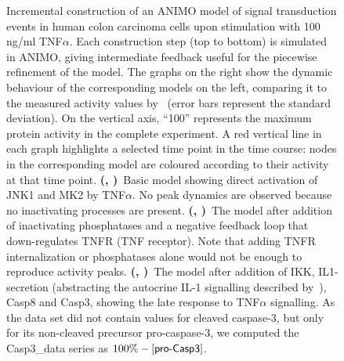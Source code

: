\begin{figure}[!bhtp]
\begin{tabular}{ll}
\end{tabular}
  \caption{
Incremental construction of an ANIMO model of signal transduction
events in human colon carcinoma cells upon stimulation with 100 ng/ml TNF$\alpha$.
Each construction step (top to bottom) is simulated in ANIMO, giving intermediate feedback
useful for the piecewise refinement of the model.
The graphs on the right show the dynamic behaviour of the corresponding models on the left, comparing it to the measured
activity values by~\cite{pathway-compendium} (error bars represent the standard deviation).
On the vertical axis, ``100'' represents the maximum protein activity in the complete experiment.
A red vertical line in each graph highlights a selected time point in the time course:
nodes in the corresponding model are coloured according to their activity at that time point.
{\bf (\protect{}, \protect{})}~Basic model showing direct activation of JNK1 and MK2 by TNF$\alpha$.
No peak dynamics are observed because no inactivating processes are present.
{\bf (\protect{}, \protect{})}~The model after addition of inactivating phosphatases and a
negative feedback loop that down-regulates TNFR (TNF receptor). Note that adding TNFR internalization or phosphatases alone would not be enough to reproduce activity peaks.
{\bf (\protect{}, \protect{})}~The model after addition of IKK, IL1-secretion (abstracting
the autocrine IL-1 signalling described by~\citealp{pathway-autocrine}), Casp8 and Casp3, showing the late response to TNF$\alpha$ signalling.
As the data set did not contain values for cleaved caspase-3, but only for its non-cleaved precursor pro-caspase-3,
we computed the {\sf Casp3\_{}data} series as $100\% - [\mbox{\sf pro-Casp3}]$.}\label{fig:small-model}
\end{figure}
